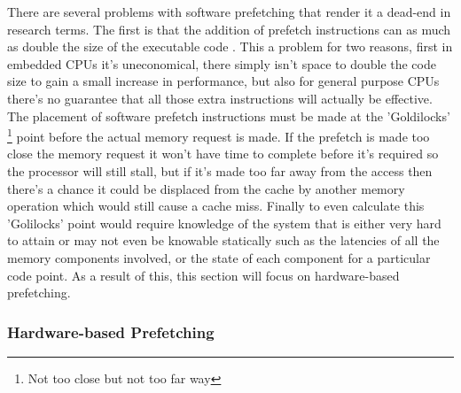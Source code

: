 There are several problems with software prefetching that render it a dead-end in research terms. The first is that the addition of prefetch instructions can as much as double the size of the executable code \cite{leeWhenPrefetchingWorks2012}. This a problem for two reasons, first in embedded CPUs it's uneconomical, there simply isn't space to double the code size to gain a small increase in performance, but also for general purpose CPUs there's no guarantee that all those extra instructions will actually be effective. The placement of software prefetch instructions must be made at the 'Goldilocks' \footnote{Not too close but not too far way} point before the actual memory request is made. If the prefetch is made too close the memory request it won't have time to complete before it's required so the processor will still stall, but if it's made too far away from the access then there's a chance it could be displaced from the cache by another memory operation which would still cause a cache miss. Finally to even calculate this 'Golilocks' point would require knowledge of the system that is either very hard to attain or may not even be knowable statically such as the latencies of all the memory components involved, or the state of each component for a particular code point. As a result of this, this section will focus on hardware-based prefetching.

\subsubsection{Hardware-based Prefetching}

